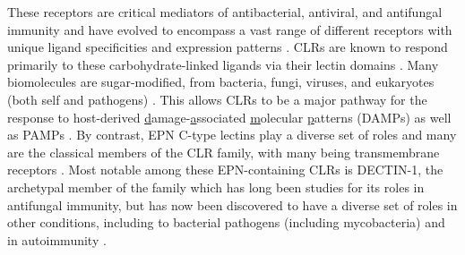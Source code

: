 These receptors are critical mediators of antibacterial, antiviral, and antifungal immunity and have evolved to encompass a vast range of different receptors with unique ligand specificities and expression patterns \citep{Hoving2014}. CLRs are known to respond primarily to these carbohydrate\hyp{}linked ligands via their lectin domains \citep{McGreal2005, Dodd2001}. Many biomolecules are sugar\hyp{}modified, from bacteria, fungi, viruses, and eukaryotes (both self and pathogens) \citep{Rudd2001, Ohtsubo2006}. This allows CLRs to be a major pathway for the response to host\hyp{}derived \underline{d}amage\hyp{}\underline{a}ssociated \underline{m}olecular \underline{p}atterns (DAMPs) as well as PAMPs \citep{GarciaVallejo2009}. By contrast, EPN C\hyp{}type lectins play a diverse set of roles and many are the classical members of the CLR family, with many being transmembrane receptors \citep{Sancho2012}. Most notable among these EPN\hyp{}containing CLRs is DECTIN\hyp{}1, the archetypal member of the family which has long been studies for its roles in antifungal immunity, but has now been discovered to have a diverse set of roles in other conditions, including to bacterial pathogens (including mycobacteria) and in autoimmunity \citep{Brown2002, Brown2003, Brown2006, Reid2009, Drummond2011b, Schorey2008, Yadav2006, Wagener2018, Deerhake2021}. 

